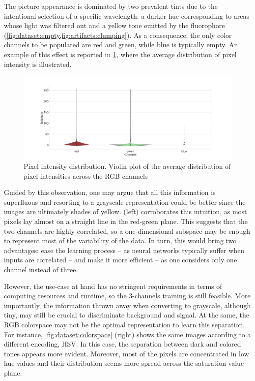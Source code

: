 The picture appearance is dominated by two prevalent tints due to the intentional selection of a specific wavelength: a darker hue corresponding to areas whose light was filtered out and a yellow tone emitted by the fluorophore
(\cref{fig:dataset:empty,fig:artifacts:clumping}).
As a consequence, the only color channels to be populated are red and green, while blue is typically empty. 
An example of this effect is reported in \cref{fig:dataset:pixel_intensity}, where the average distribution of pixel intensity is illustrated.
\begin{figure}
    \centering
    \includegraphics[width=\textwidth]{figures/120_dataset/pixel_intensity_distribution.png}
    \caption{Pixel intensity distribution. Violin plot of the average distribution of pixel intensities across the  RGB channels}
    \label{fig:dataset:pixel_intensity}
\end{figure}
Guided by this observation, one may argue that all this information is superfluous and resorting to a grayscale representation could be better since the images are ultimately shades of yellow.
 (left) corroborates this intuition, as most pixels lay almost on a straight line in the red-green plane. 
This suggests that the two channels are highly correlated, so a one-dimensional subspace may be enough to represent most of the variability of the data.
In turn, this would bring two advantages: ease the learning process -- as neural networks typically suffer when inputs are correlated %
-- and make it more efficient -- as one considers only one channel instead of three.

However, the use-case at hand has no stringent requirements in terms of computing resources and runtime, so the 3-channels training is still feasible.
More importantly, the information thrown away when converting to grayscale, although tiny, may still be crucial to discriminate background and signal. 
At the same, the RGB colorspace may not be the optimal representation to learn this separation. For instance, \cref{fig:dataset:colorspace} (right) shows the same images according to a different encoding, HSV. 
In this case, the separation between dark and colored tones appears more evident. 
Moreover, most of the pixels are concentrated in low hue values
and their distribution seems more spread across the saturation-value plane. 

